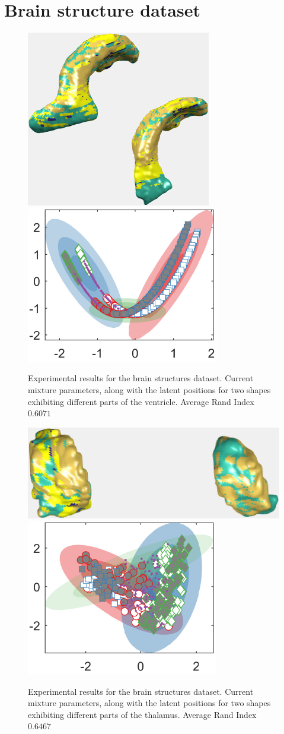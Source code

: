 \documentclass[]{article}
\begin{document}
\section{Brain structure dataset}
\begin{figure}[ht!]
	\centering
	
	\includegraphics[width=0.45\linewidth]{img/ventricle1MVMMexp1}
	\includegraphics[width=0.35\linewidth]{img/ventricle1MVMMexp3}
	\caption{Experimental results for the brain structures dataset.  Current mixture parameters, along with the latent positions for two shapes exhibiting different parts of the ventricle. Average Rand Index $0.6071$ }
\end{figure}

\begin{figure}[ht!]
	\centering
	
	\includegraphics[width=0.45\linewidth]{img/thalamus1MVMMexp1}
	\includegraphics[width=0.35\linewidth]{img/thalamus1MVMMexp3}
	\caption{Experimental results for the brain structures dataset.  Current mixture parameters, along with the latent positions for two shapes exhibiting different parts of the thalamus. Average Rand Index $0.6467$ }
\end{figure}
\end{document}
